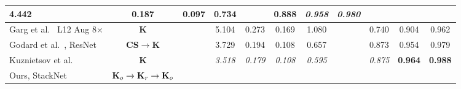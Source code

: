 \documentclass[runningheads]{llncs}
\begin{document}
\begin{table}[tb]
\begin{tabular}{lcccccccccc}
		\textbf{4.442} & \textbf{0.187} & 
		\textbf{0.097} & \textbf{0.734} && 
		\textbf{0.888} & \textit{0.958} & \textit{0.980} \\
		\hline
		\hline
		Garg et al.~\cite{garg2016unsupervised} L12 Aug 8$\times$
		&\textbf{K}&& 
		5.104 & 0.273 & 0.169 & 1.080 
		&& 0.740 & 0.904 & 0.962 \\
		Godard et al.~\cite{godard2016unsupervised}, ResNet 
		&\textbf{CS}$\rightarrow$\textbf{K}&& 
		3.729 & 0.194 & 0.108 & 
		0.657 && 0.873 & 0.954 & 0.979 \\
		Kuznietsov et al.~\cite{kuznietsov2017semi} &\textbf{K}&& 
		\textit{3.518} & 
		\textit{0.179} & 
		\textit{0.108} & \textit{0.595} 
		&& \textit{0.875} & \textbf{0.964} & \textbf{0.988} \\
		Ours, StackNet
		&$\text{\textbf{K}}_o\rightarrow\text{\textbf{K}}_r\rightarrow\text{\textbf{K}}_o$&&
		

\end{tabular}
\end{table}
\end{document}

